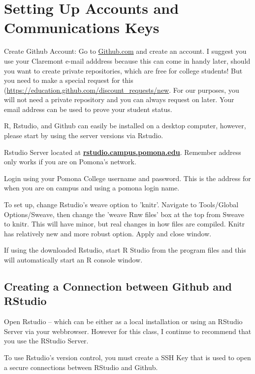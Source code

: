 \documentclass[12pt]{../SOP4_alpha}\usepackage[]{graphicx}\usepackage[]{color}
\begin{document}
\section{Setting Up Accounts and Communications Keys}

\NP Create Github Account: Go to \href{http:\\github.com}{Github.com} and create an account. I suggest you use your Claremont e-mail adddress because this can come in handy later, should you want to create private repositories, which are free for college students! But you need to make a special request for this (\url{https://education.github.com/discount_requests/new}. For our purposes, you will not need a private repository and you can always request on later. Your email address can be used to prove your student status. 
  

\NP R, Rstudio, and Github can easily be installed on a desktop computer, however, please start by using the server versions via Rstudio. 

\NP Rstudio Server located at \href{http://rstudio.campus.pomona.edu}{\textbf{rstudio.campus.pomona.edu}}. Remember address only works if you are on Pomona's network. 

\NP Login using your Pomona College username and password. This is the address for when you are on campus and using a pomona login name. 

\NP To set up, change Rstudio's weave option to 'knitr'. Navigate to Tools/Global Options/Sweave, then change the 'weave Rnw files' box at the top from Sweave to knitr. This will have minor, but real changes in how files are compiled. Knitr has relatively new and more robust option. Apply and close window. 

\NP If using the downloaded Rstudio, start R Studio from the program files and this will automatically start an R console window.

\subsection{Creating a Connection between Github and RStudio}

\NP Open Rstudio -- which can be either as a local installation or using an RStudio Server via your webbrowser. However for this class, I continue to recommend that you use the RStudio Server.

\NP To use Rstudio's version control, you must create a SSH Key that is used to open a secure connections between RStudio and Github.
\end{document}
